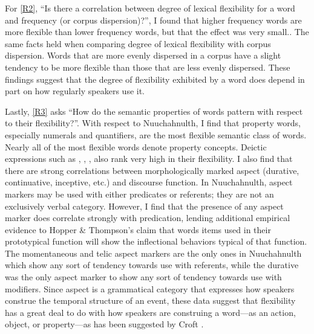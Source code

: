 For \ref{R2}, \enquote{Is there a correlation between degree of lexical flexibility for a word and frequency (or corpus dispersion)?}, I found that higher frequency words are more flexible than lower frequency words, but that the effect was very small.. The same facts held when comparing degree of lexical flexibility with corpus dispersion. Words that are more evenly dispersed in a corpus have a slight tendency to be more flexible than those that are less evenly dispersed. These findings suggest that the degree of flexibility exhibited by a word does depend in part on how regularly speakers use it.

Lastly, \ref{R3} asks \enquote{How do the semantic properties of words pattern with respect to their flexibility?}. With respect to Nuuchahnulth, I find that property words, especially numerals and quantifiers, are the most flexible semantic class of words. Nearly all of the most flexible words denote property concepts. Deictic expressions such as , , ,  also rank very high in their flexibility. I also find that there are strong correlations between morphologically marked aspect (durative, continuative, inceptive, etc.) and discourse function. In Nuuchahnulth, aspect markers may be used with either predicates or referents; they are not an exclusively verbal category. However, I find that the presence of any aspect marker does correlate strongly with predication, lending additional empirical evidence to Hopper \& Thompson's  claim that words items used in their prototypical function will show the inflectional behaviors typical of that function. The momentaneous and telic aspect markers are the only ones in Nuuchahnulth which show any sort of tendency towards use with referents, while the durative was the only aspect marker to show any sort of tendency towards use with modifiers. Since aspect is a grammatical category that expresses how speakers construe the temporal structure of an event, these data suggest that flexibility has a great deal to do with how speakers are construing a word—as an action, object, or property—as has been suggested by Croft .

